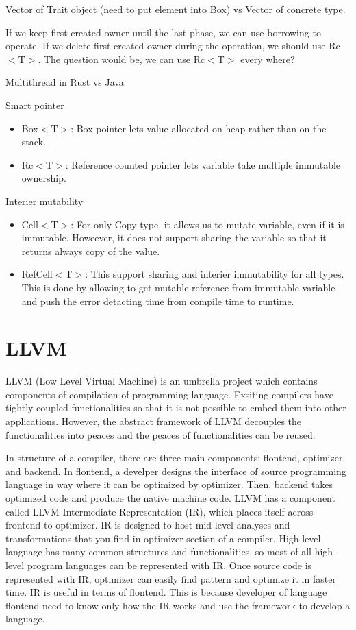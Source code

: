 Vector of Trait object (need to put element into Box) vs Vector of concrete type.


If we keep first created owner until the last phase, we can use borrowing to operate.
If we delete first created owner during the operation, we should use Rc$<$T$>$.
The question would be, we can use Rc$<$T$>$ every where?

Multithread in Rust vs Java

Smart pointer
\begin{itemize}
    \item Box$<$T$>$: Box pointer lets value allocated on heap rather than on the stack.
    \item Rc$<$T$>$: Reference counted pointer lets variable take multiple immutable ownership.
\end{itemize}

Interier mutability
\begin{itemize}
    \item Cell$<$T$>$: For only Copy type, it allows us to mutate variable, even if it is immutable. Howeever, it does not support sharing the variable so that it returns always copy of the value.
    \item RefCell$<$T$>$: This support sharing and interier immutability for all types. This is done by allowing to get mutable reference from immutable variable and push the error detacting time from compile time to runtime.
\end{itemize}    

\section{LLVM}
\label{sec:history}
LLVM (Low Level Virtual Machine) is an umbrella project which contains components of compilation of programming language.
Exsiting compilers have tightly coupled functionalities so that it is not possible to embed them into other applications.
However, the abstract framework of LLVM decouples the functionalities into peaces and the peaces of functionalities can be reused.

In structure of a compiler, there are three main components; flontend, optimizer, and backend. 
In flontend, a develper designs the interface of source programming language in way where it can be optimized by optimizer. 
Then, backend takes optimized code and produce the native machine code. LLVM has a component called LLVM Intermediate Representation (IR), 
which places itself across frontend to optimizer. IR is designed to host mid-level analyses and transformations that you find in optimizer section of a compiler.
High-level language has many common structures and functionalities, so most of all high-level program languages can be represented with IR. 
Once source code is represented with IR, optimizer can easily find pattern and optimize it in faster time. 
IR is useful in terms of flontend. This is because developer of language flontend need to know only how the IR works and use the framework to develop a language.

